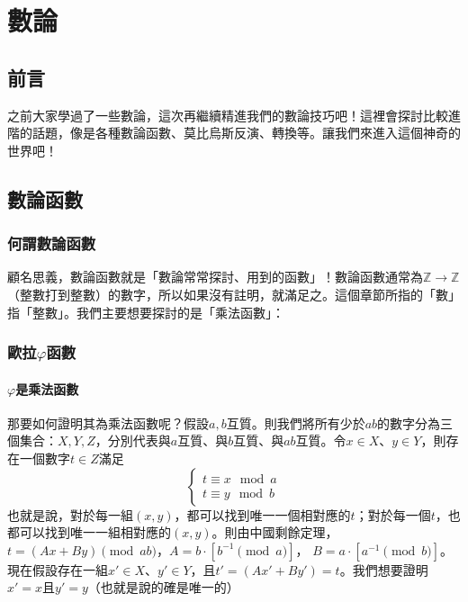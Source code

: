 \chapter{數論 \uppercase\expandafter{}}
\section*{前言}
	之前大家學過了一些數論，這次再繼續精進我們的數論技巧吧！這裡會探討比較進階的話題，像是各種數論函數、莫比烏斯反演、轉換等。讓我們來進入這個神奇的世界吧！
\section*{數論函數}
	\subsection*{何謂數論函數}
	顧名思義，數論函數就是「數論常常探討、用到的函數」！數論函數通常為$\mathbb{Z} \rightarrow \mathbb{Z}$（整數打到整數）的數字，所以如果沒有註明，就滿足之。這個章節所指的「數」指「整數」。我們主要想要探討的是「乘法函數」：
	\subsection*{歐拉$\varphi$函數}
		\subsubsection{$\varphi$是乘法函數}
		那要如何證明其為乘法函數呢？假設$a, b$互質。則我們將所有少於$ab$的數字分為三個集合：$X, Y, Z$，分別代表與$a$互質、與$b$互質、與$ab$互質。令$x \in X$、$y \in Y$，則存在一個數字$t \in Z$滿足
		$$\begin{cases}
		t\equiv x \mod a\\
		t\equiv y \mod b
		\end{cases}$$
		也就是說，對於每一組$(x, y)$，都可以找到唯一一個相對應的$t$；對於每一個$t$，也都可以找到唯一一組相對應的$(x, y)$。則由中國剩餘定理，$t = (Ax + By) \pmod{ab}$，$A = b \cdot \left[b^{-1} \pmod a\right]$， $B = a \cdot \left[a^{-1} \pmod b\right]$。現在假設存在一組$x' \in X$、$y' \in Y$，且$t' = (Ax' + By') = t$。我們想要證明$x' = x$且$y' = y$（也就是說的確是唯一的）
		
